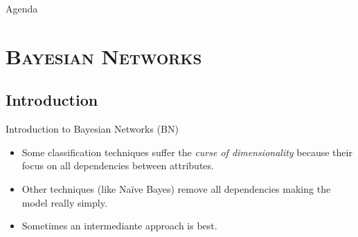 \documentclass[xcolor=x11names,compress]{beamer}
\renewcommand{\(}{\begin{columns}}
\renewcommand{\)}{\end{columns}}
\newcommand{\<}[1]{\begin{column}{#1}}
\renewcommand{\>}{\end{column}}
\begin{document}

\begin{frame}{Agenda}
\tableofcontents
\end{frame}

\section{\scshape Bayesian Networks}
\subsection{Introduction}
\begin{frame}{Introduction to Bayesian Networks (BN)}
\begin{itemize}
	\item Some classification techniques suffer the \emph{curse of dimensionality} because their focus on all dependencies between attributes.
	\item Other techniques (like Naïve Bayes) remove all dependencies making the model really simply.
	\item Sometimes an intermediante approach is best.
\end{itemize}
\end{frame}
\end{document}
